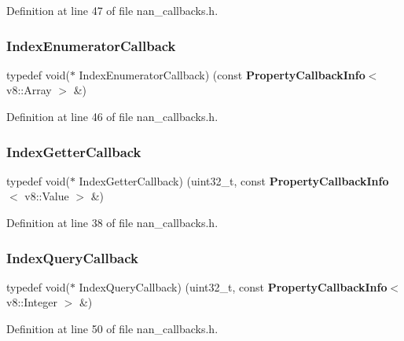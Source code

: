 Definition at line 47 of file nan\+\_\+callbacks.\+h.

\mbox{\label{nan__callbacks_8h_ae03f3ed6f988ddebc06aa476ae131ee9}} 
\subsubsection{Index\+Enumerator\+Callback}
{\footnotesize\ttfamily typedef void($\ast$ Index\+Enumerator\+Callback) (const \textbf{ Property\+Callback\+Info}$<$ v8\+::\+Array $>$ \&)}



Definition at line 46 of file nan\+\_\+callbacks.\+h.

\mbox{\label{nan__callbacks_8h_aab2bc4aa0ccb3b65a88d175934f6e860}} 
\subsubsection{Index\+Getter\+Callback}
{\footnotesize\ttfamily typedef void($\ast$ Index\+Getter\+Callback) (uint32\+\_\+t, const \textbf{ Property\+Callback\+Info}$<$ v8\+::\+Value $>$ \&)}



Definition at line 38 of file nan\+\_\+callbacks.\+h.

\mbox{\label{nan__callbacks_8h_a5f4f90c948d45ff30f721de5abaa5378}} 
\subsubsection{Index\+Query\+Callback}
{\footnotesize\ttfamily typedef void($\ast$ Index\+Query\+Callback) (uint32\+\_\+t, const \textbf{ Property\+Callback\+Info}$<$ v8\+::\+Integer $>$ \&)}



Definition at line 50 of file nan\+\_\+callbacks.\+h.

\mbox{\label{nan__callbacks_8h_a831245c53d53746c45ee641be8f6b76b}} 
